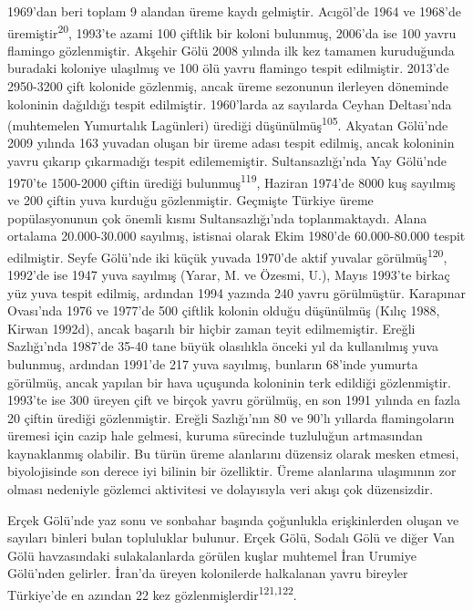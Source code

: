 \documentclass[
  letterpaper,
  DIV=11,
  numbers=noendperiod]{scrreprt}
\begin{document}
1969'dan beri toplam 9 alandan üreme kaydı gelmiştir. Acıgöl'de 1964 ve
1968'de üremiştir\textsuperscript{20}, 1993'te azami 100 çiftlik bir
koloni bulunmuş, 2006'da ise 100 yavru flamingo gözlenmiştir. Akşehir
Gölü 2008 yılında ilk kez tamamen kuruduğunda buradaki koloniye
ulaşılmış ve 100 ölü yavru flamingo tespit edilmiştir. 2013'de 2950-3200
çift kolonide gözlenmiş, ancak üreme sezonunun ilerleyen döneminde
koloninin dağıldığı tespit edilmiştir. 1960'larda az sayılarda Ceyhan
Deltası'nda (muhtemelen Yumurtalık Lagünleri) ürediği
düşünülmüş\textsuperscript{105}. Akyatan Gölü'nde 2009 yılında 163
yuvadan oluşan bir üreme adası tespit edilmiş, ancak koloninin yavru
çıkarıp çıkarmadığı tespit edilememiştir. Sultansazlığı'nda Yay Gölü'nde
1970'te 1500-2000 çiftin ürediği bulunmuş\textsuperscript{119}, Haziran
1974'de 8000 kuş sayılmış ve 200 çiftin yuva kurduğu gözlenmiştir.
Geçmişte Türkiye üreme popülasyonunun çok önemli kısmı Sultansazlığı'nda
toplanmaktaydı. Alana ortalama 20.000-30.000 sayılmış, istisnai olarak
Ekim 1980'de 60.000-80.000 tespit edilmiştir. Seyfe Gölü'nde iki küçük
yuvada 1970'de aktif yuvalar görülmüş\textsuperscript{120}, 1992'de ise
1947 yuva sayılmış (Yarar, M. ve Özesmi, U.), Mayıs 1993'te birkaç yüz
yuva tespit edilmiş, ardından 1994 yazında 240 yavru görülmüştür.
Karapınar Ovası'nda 1976 ve 1977'de 500 çiftlik kolonin olduğu
düşünülmüş (Kılıç 1988, Kirwan 1992d), ancak başarılı bir hiçbir zaman
teyit edilmemiştir. Ereğli Sazlığı'nda 1987'de 35-40 tane büyük
olasılıkla önceki yıl da kullanılmış yuva bulunmuş, ardından 1991'de 217
yuva sayılmış, bunların 68'inde yumurta görülmüş, ancak yapılan bir hava
uçuşunda koloninin terk edildiği gözlenmiştir. 1993'te ise 300 üreyen
çift ve birçok yavru görülmüş, en son 1991 yılında en fazla 20 çiftin
ürediği gözlenmiştir. Ereğli Sazlığı'nın 80 ve 90'lı yıllarda
flamingoların üremesi için cazip hale gelmesi, kuruma sürecinde
tuzluluğun artmasından kaynaklanmış olabilir. Bu türün üreme alanlarını
düzensiz olarak mesken etmesi, biyolojisinde son derece iyi bilinin bir
özelliktir. Üreme alanlarına ulaşımının zor olması nedeniyle gözlemci
aktivitesi ve dolayısıyla veri akışı çok düzensizdir.

Erçek Gölü'nde yaz sonu ve sonbahar başında çoğunlukla erişkinlerden
oluşan ve sayıları binleri bulan topluluklar bulunur. Erçek Gölü, Sodalı
Gölü ve diğer Van Gölü havzasındaki sulakalanlarda görülen kuşlar
muhtemel İran Urumiye Gölü'nden gelirler. İran'da üreyen kolonilerde
halkalanan yavru bireyler Türkiye'de en azından 22 kez
gözlenmişlerdir\textsuperscript{121,122}.
\end{document}
